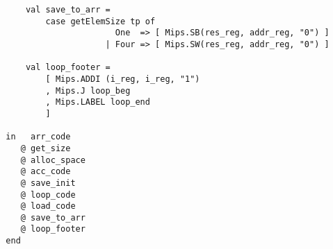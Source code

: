 \documentclass[12pt]{article}
\begin{document}
\begin{verbatim}
      val save_to_arr =
          case getElemSize tp of
                        One  => [ Mips.SB(res_reg, addr_reg, "0") ]
                      | Four => [ Mips.SW(res_reg, addr_reg, "0") ]

      val loop_footer =
          [ Mips.ADDI (i_reg, i_reg, "1")
          , Mips.J loop_beg
          , Mips.LABEL loop_end
          ]

  in   arr_code 
     @ get_size
     @ alloc_space
     @ acc_code 
     @ save_init
     @ loop_code 
     @ load_code 
     @ save_to_arr
     @ loop_footer
  end
\end{verbatim}
\end{document}
